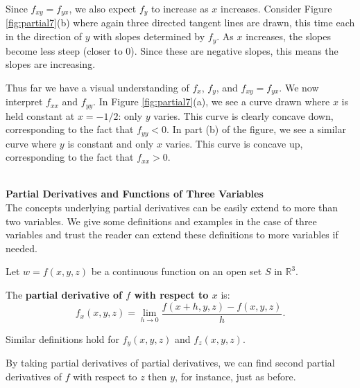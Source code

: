 {Since $f_{xy}=f_{yx}$, we also expect $f_y$ to increase as $x$ increases. Consider Figure \ref{fig:partial7}(b) where again three directed tangent lines are drawn, this time each in the direction of $y$ with slopes determined by $f_y$. As $x$ increases, the slopes become less steep (closer to 0). Since these are negative slopes, this means the slopes are increasing.

Thus far we have a visual understanding of $f_x$, $f_y$, and $f_{xy}=f_{yx}$. We now interpret $f_{xx}$ and $f_{yy}$. In Figure \ref{fig:partial7}(a), we see a curve drawn where $x$ is held constant at $x=-1/2$: only $y$ varies. This curve is clearly concave down, corresponding to the fact that $f_{yy}<0$. In part (b) of the figure, we see a similar curve where $y$ is constant and only $x$ varies. This curve is concave up, corresponding to the fact that $f_{xx}>0$.
 }\\

\noindent\textbf{\large Partial Derivatives and Functions of Three Variables}\\

The concepts underlying partial derivatives can be easily extend to more than two variables. We give some definitions and examples in the case of three variables and trust the reader can extend these definitions to more variables if needed.

{Let $w=f(x,y,z)$ be a continuous function on an open set $S$ in $\mathbb{R}^3$. 

The \textbf{partial derivative of $f$ with respect to $x$} is:
	$$f_x(x,y,z) = \lim_{h\to 0} \frac{f(x+h,y,z)-f(x,y,z)}{h}.$$
	
	Similar definitions hold for $f_y(x,y,z)$ and $f_z(x,y,z)$.
}

By taking partial derivatives of partial derivatives, we can find second partial derivatives of $f$ with respect to $z$ then $y$, for instance, just as before.\\

